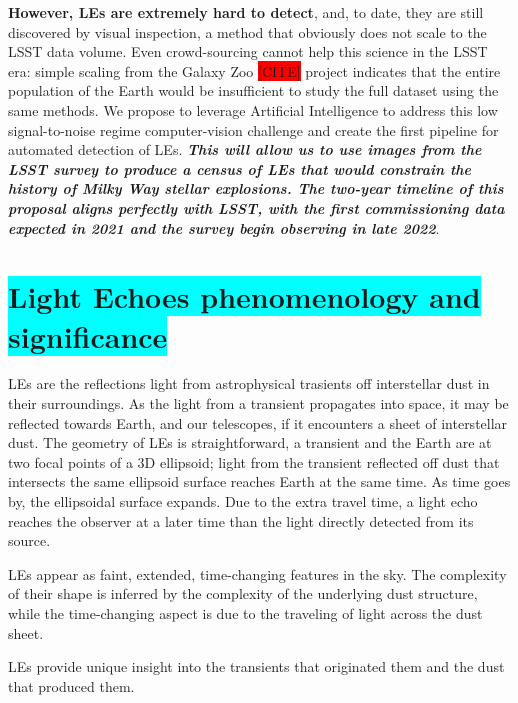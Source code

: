 \documentclass{proposalnsf}
\newcommand{\armin}[1]{\colorbox{cyan}{#1}}
\newcommand{\ana}[1]{\colorbox{red}{#1}}
\begin{document}
{\bf However, LEs are extremely hard to detect}, and, to date, they are still discovered by visual inspection, a method that obviously does not scale to the LSST data volume.   Even crowd-sourcing cannot help this science in the LSST era: simple scaling from the Galaxy Zoo \ana{[CITE]} project indicates that the entire population of the Earth would be insufficient to study the full dataset using the same methods.   We propose to leverage Artificial Intelligence to address this low signal-to-noise regime computer-vision challenge and create the first pipeline for automated detection of LEs.   {\bf \emph{This will allow us to use images from the LSST survey to produce a census of LEs that would constrain the history of Milky Way stellar explosions.   The two-year timeline of this proposal aligns perfectly with LSST, with the first commissioning data expected in 2021 and the survey begin observing in late 2022}}.






\section{\armin{ Light Echoes phenomenology and significance}}
LEs are the reflections light from astrophysical trasients off interstellar dust in their surroundings.   As the light from a transient propagates into space, it may be reflected towards Earth, and our telescopes, if it encounters a sheet of interstellar dust.  The geometry of LEs is straightforward, a transient and the Earth are at two focal points of a 3D ellipsoid; light from the transient reflected off dust that intersects the same ellipsoid surface reaches Earth at the same time.  As time goes by, the ellipsoidal surface expands.  Due to the extra travel time, a light echo reaches the observer at a later time than the light directly detected from its source.

LEs appear as faint, extended, time-changing features in the sky.  The complexity of their shape is inferred by the complexity of the underlying dust structure, while the time-changing aspect is due to the traveling of light across the dust sheet.

LEs provide unique insight into the transients that originated them and the dust that produced them.  
\end{document}
